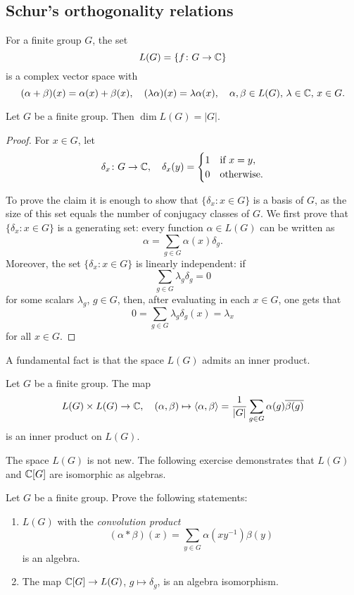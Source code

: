 \subsection{Schur's orthogonality relations}

For a finite group $G$, the set                             
\[
L(G)=\{f\colon G\to\mathbb{C}\}
\]
is a complex vector space with
\[
    (\alpha+\beta)(x)=\alpha(x)+\beta(x),
    \quad
    (\lambda\alpha)(x)=\lambda\alpha(x),
    \quad 
    \alpha,\beta\in L(G),\,\lambda\in\mathbb{C},\,x\in G.
\]

\begin{proposition}
\label{pro:dimL(G)=|G|}
    Let $G$ be a finite group. Then $\dim L(G)=|G|$. 
\end{proposition}

\begin{proof}
For $x\in G$, 
let 
\[
\delta_x\colon G\to\mathbb{C},\quad \delta_x(y)=\begin{cases}
    1 & \text{if $x=y$},\\
    0 & \text{otherwise.}
    \end{cases}
\]

To prove the claim it is enough to show that 
$\{\delta_x:x\in G\}$ is a basis of $G$, as the size of this set equals the
number of conjugacy classes of $G$. 
We first prove that $\{\delta_x:x\in G\}$  is a generating set: every function
$\alpha\in L(G)$ can be written as
\[
\alpha=\sum_{g\in G}\alpha(x)\delta_g.
\]
Moreover, the set $\{\delta_x:x\in G\}$ is linearly independent: if 
\[
\sum_{g\in G}\lambda_g\delta_g=0
\]
for some scalars $\lambda_g$, $g\in G$, then, after evaluating in each $x\in G$, one gets that 
\[
0%
=\sum_{g\in G}\lambda_g\delta_g(x)=\lambda_x
\]
for all $x\in G$. 
\end{proof}

A fundamental fact is that the space $L(G)$ admits an inner product. 

\begin{exercise}
Let $G$ be a finite group. The map 
\[
L(G)\times L(G)\to\mathbb{C},\quad 
(\alpha,\beta)\mapsto \langle\alpha,\beta\rangle=\frac{1}{|G|}\sum_{g\in G}\alpha(g)\overline{\beta(g)}
\]
is an inner product on $L(G)$. 
\end{exercise}

The space $L(G)$ is not new. The following exercise demonstrates that 
$L(G)$ and $\mathbb{C}[G]$ are isomorphic as algebras. 

\begin{bonus}
Let $G$ be a finite group. Prove the following statements:
\begin{enumerate}
    \item $L(G)$ with the \emph{convolution product}
    \[
    (\alpha*\beta)(x)=\sum_{y\in G}\alpha(xy^{-1})\beta(y)
    \]
    is an algebra. 
    \item The map $\mathbb{C}[G]\to L(G)$, $g\mapsto\delta_g$,
        is an algebra isomorphism.
    \end{enumerate}
\end{bonus}


